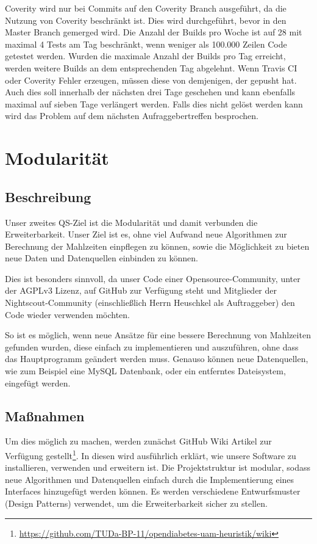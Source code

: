 \documentclass[accentcolor=tud0b,12pt,paper=a4]{tudreport}
\begin{document}
Coverity wird nur bei Commits auf den Coverity Branch ausgeführt, da die Nutzung von Coverity beschränkt ist. Dies wird durchgeführt, bevor in den Master Branch gemerged wird. Die Anzahl der Builds pro Woche ist auf 28 mit maximal 4 Tests am Tag beschränkt, wenn weniger als 100.000 Zeilen Code getestet werden. Wurden die maximale Anzahl der Builds pro Tag erreicht, werden weitere Builds an dem entsprechenden Tag abgelehnt. Wenn Travis CI oder Coverity Fehler erzeugen, müssen diese von demjenigen, der gepusht hat. Auch dies soll innerhalb der nächsten drei Tage geschehen und kann ebenfalls maximal auf sieben Tage verlängert werden. Falls dies nicht gelöst werden kann wird das Problem auf dem nächsten Aufraggebertreffen besprochen.

\newpage

\section{Modularität}

\subsection{Beschreibung}

Unser zweites QS-Ziel ist die Modularität und damit verbunden die Erweiterbarkeit. Unser Ziel ist es, ohne viel Aufwand neue Algorithmen zur Berechnung der Mahlzeiten einpflegen zu können, sowie die Möglichkeit zu bieten neue Daten und Datenquellen einbinden zu können.

Dies ist besonders sinnvoll, da unser Code einer Opensource-Community, unter der \mbox{AGPLv3} Lizenz, auf GitHub zur Verfügung steht und Mitglieder der Nightscout-Community (einschließlich Herrn Heuschkel als Auftraggeber) den Code wieder verwenden möchten.

So ist es möglich, wenn neue Ansätze für eine bessere Berechnung von Mahlzeiten gefunden wurden, diese einfach zu implementieren und auszuführen, ohne dass das Hauptprogramm geändert werden muss. Genauso können neue Datenquellen, wie zum Beispiel eine MySQL Datenbank, oder ein entferntes Dateisystem, eingefügt werden.

\subsection{Maßnahmen}

Um dies möglich zu machen, werden zunächst GitHub Wiki Artikel zur Verfügung gestellt\footnote{\url{https://github.com/TUDa-BP-11/opendiabetes-uam-heuristik/wiki}}. In diesen wird ausführlich erklärt, wie unsere Software zu installieren, verwenden und erweitern ist. Die Projektstruktur ist modular, sodass neue Algorithmen und Datenquellen einfach durch die Implementierung eines Interfaces hinzugefügt werden können. Es werden verschiedene Entwurfsmuster (Design Patterns) verwendet, um die Erweiterbarkeit sicher zu stellen.
\end{document}

